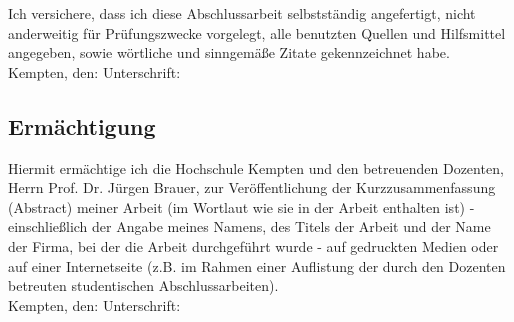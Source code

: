Ich versichere, dass ich diese Abschlussarbeit selbstständig angefertigt, nicht anderweitig für Prüfungszwecke vorgelegt, alle benutzten Quellen und Hilfsmittel angegeben, sowie wörtliche und sinngemäße Zitate gekennzeichnet habe.
\\[2.5cm]

Kempten, den:  \hrulefill\enspace\enspace\enspace  Unterschrift:  \hrulefill
\\[2.5cm]

%

\subsection{Ermächtigung}
\label{Ermächtigung}
%

Hiermit ermächtige ich die Hochschule Kempten und den betreuenden Dozenten, Herrn Prof. Dr. Jürgen Brauer, zur Veröffentlichung der Kurzzusammenfassung (Abstract) meiner Arbeit (im Wortlaut wie sie in der Arbeit enthalten ist) - einschließlich der Angabe meines Namens, des Titels der Arbeit und der Name der Firma, bei der die Arbeit durchgeführt wurde - auf gedruckten Medien oder auf einer Internetseite (z.B. im Rahmen einer Auflistung der durch den Dozenten betreuten studentischen Abschlussarbeiten).
\\[2.5cm]

Kempten, den:  \hrulefill\enspace\enspace  Unterschrift:  \hrulefill


